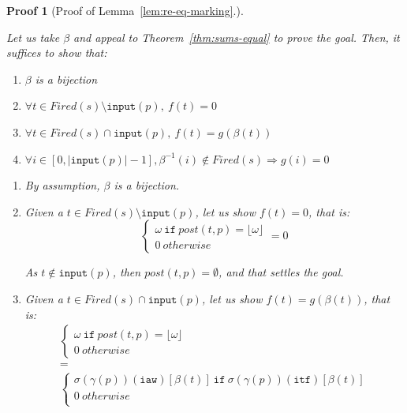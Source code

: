 \documentclass[pdflatex,sn-mathphys]{sn-jnl}%
\theoremstyle{thmstyleone}%
\theoremstyle{thmstyletwo}%
\newtheorem*{pf}{Proof}%
\theoremstyle{thmstylethree}%
\begin{document}
\begin{pf}[Proof of Lemma~\ref{lem:re-eq-marking}.]
\begin{itemize}
    Let us take $\beta$ and appeal to Theorem~\ref{thm:sums-equal} to
    prove the goal. Then, it suffices to show that:
    \begin{enumerate}
    \item $\beta$ is a bijection
    \item $\forall{}t\in{}Fired(s)\setminus{}\mathtt{input}(p),~f(t)=0$
    \item $\forall{}t\in{}Fired(s)\cap{}\mathtt{input}(p),~f(t)=g(\beta(t))$
    \item
      $\forall{}i\in{}[0,\vert\mathtt{input}(p)\vert-1],\beta^{-1}(i)\notin{}Fired(s)\Rightarrow{}g(i)=0$
    \end{enumerate}

    \bigskip
    
    \begin{enumerate}
    \item By assumption, $\beta$ is a bijection.
    \item Given a $t\in{}Fired(s)\setminus{}\mathtt{input}(p)$, let us
      show $f(t)=0$, that is:
      \begin{equation*}
        \boxed{
          \begin{cases}
            \omega~\mathtt{if}~post(t,p)=\lfloor\omega\rfloor \\
            0~otherwise
          \end{cases}=0
        }
      \end{equation*}

      \noindent{}As $t\notin{}\mathtt{input}(p)$, then
      $post(t,p)=\emptyset$, and that settles the goal.
      
    \item Given a $t\in{}Fired(s)\cap\mathtt{input}(p)$, let us show
      $f(t)=g(\beta(t))$, that is:
      \begin{equation*}
        \boxed{\begin{array}{c}
          \begin{cases}
            \omega~\mathtt{if}~post(t,p)=\lfloor\omega\rfloor \\
            0~otherwise
          \end{cases} \\
          = \\
          \begin{cases}
            \sigma(\gamma(p))(\texttt{iaw})[\beta(t)]~\mathtt{if}~\sigma(\gamma(p))(\texttt{itf})[\beta(t)] \\
            0~otherwise \\
          \end{cases} \\         
        \end{array}}
      \end{equation*}



\end{enumerate}
\end{itemize}
\end{pf}
\end{document}
